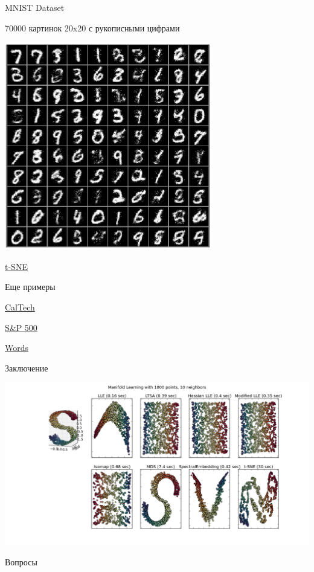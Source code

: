 \documentclass[10pt]{beamer}
\begin{document}
\begin{frame}{MNIST Dataset}

70000 картинок 20x20 с рукописными цифрами 

\begin{center}
\includegraphics[scale=1.0]{images/mnistdigits.jpg}
\end{center}

\href{http://lvdmaaten.github.io/tsne/examples/mnist_tsne.jpg}{t-SNE}

\end{frame}

\begin{frame}{Еще примеры}

\href{http://lvdmaaten.github.io/tsne/examples/caltech101_tsne.jpg}{CalTech}

\vspace{1em}
\href{http://lvdmaaten.github.io/tsne/examples/SP500_tsne.png}{S\&P 500}

\vspace{1em}
\href{http://www.cs.toronto.edu/~hinton/turian.png}{Words}

\end{frame}

\begin{frame}{Заключение}

\begin{center}
\includegraphics[scale=0.27]{images/mainfold.png}
\end{center}

\end{frame}

\begin{frame}[plain]
\begin{center}
{\Large Вопросы}
\end{center}
\end{frame}
\end{document}
